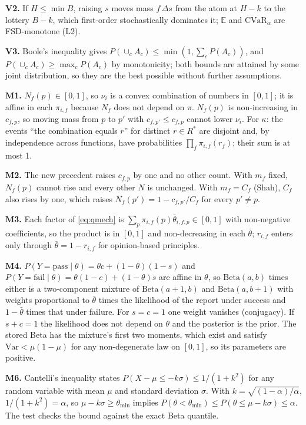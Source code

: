 \documentclass[11pt]{article}
\theoremstyle{definition}
\begin{document}
\textbf{V2.} If $H\le\min B$, raising $s$ moves mass $f\,\Delta s$ from the atom at $H-k$ to the
lottery $B-k$, which first-order stochastically dominates it; $\mathbb E$ and $\mathrm{CVaR}_\alpha$
are FSD-monotone (L2).

\textbf{V3.} Boole's inequality gives $P(\cup_cA_c)\le\min(1,\sum_cP(A_c))$, and
$P(\cup_cA_c)\ge\max_cP(A_c)$ by monotonicity; both bounds are attained by some joint
distribution, so they are the best possible without further assumptions.

\textbf{M1.} $N_f(p)\in[0,1]$, so $\nu_i$ is a convex combination of numbers in $[0,1]$; it is
affine in each $\pi_{i,f}$ because $N_f$ does not depend on $\pi$. $N_f(p)$ is non-increasing in
$c_{f,p}$, so moving mass from $p$ to $p'$ with $c_{f,p'}\le c_{f,p}$ cannot lower $\nu_i$. For
$\kappa$: the events ``the combination equals $r$'' for distinct $r\in R^\ast$ are disjoint and, by
independence across functions, have probabilities $\prod_f\pi_{i,f}(r_f)$; their sum is at most 1.

\textbf{M2.} The new precedent raises $c_{f,p}$ by one and no other count. With $m_f$ fixed,
$N_f(p)$ cannot rise and every other $N$ is unchanged. With $m_f=C_f$ (Shah), $C_f$ also rises by
one, which raises $N_f(p')=1-c_{f,p'}/C_f$ for every $p'\ne p$.

\textbf{M3.} Each factor of \eqref{eq:qmech} is $\sum_p\pi_{i,f}(p)\bar\theta_{i,f,p}\in[0,1]$ with
non-negative coefficients, so the product is in $[0,1]$ and non-decreasing in each $\bar\theta$;
$r_{i,f}$ enters only through $\bar\theta=1-r_{i,f}$ for opinion-based principles.

\textbf{M4.} $P(Y=\text{pass}\mid\theta)=\theta c+(1-\theta)(1-s)$ and
$P(Y=\text{fail}\mid\theta)=\theta(1-c)+(1-\theta)s$ are affine in $\theta$, so
$\mathrm{Beta}(a,b)$ times either is a two-component mixture of $\mathrm{Beta}(a+1,b)$ and
$\mathrm{Beta}(a,b+1)$ with weights proportional to $\bar\theta$ times the likelihood of the report
under success and $1-\bar\theta$ times that under failure. For $s=c=1$ one weight vanishes
(conjugacy). If $s+c=1$ the likelihood does not depend on $\theta$ and the posterior is the prior.
The stored Beta has the mixture's first two moments, which exist and satisfy
$\mathrm{Var}<\mu(1-\mu)$ for any non-degenerate law on $[0,1]$, so its parameters are positive.

\textbf{M6.} Cantelli's inequality states $P(X-\mu\le-k\sigma)\le1/(1+k^2)$ for any random variable
with mean $\mu$ and standard deviation $\sigma$. With $k=\sqrt{(1-\alpha)/\alpha}$, $1/(1+k^2)=\alpha$, so
$\mu-k\sigma\ge\theta_{\min}$ implies $P(\theta<\theta_{\min})\le P(\theta\le\mu-k\sigma)\le\alpha$.
The test checks the bound against the exact Beta quantile.
\end{document}
